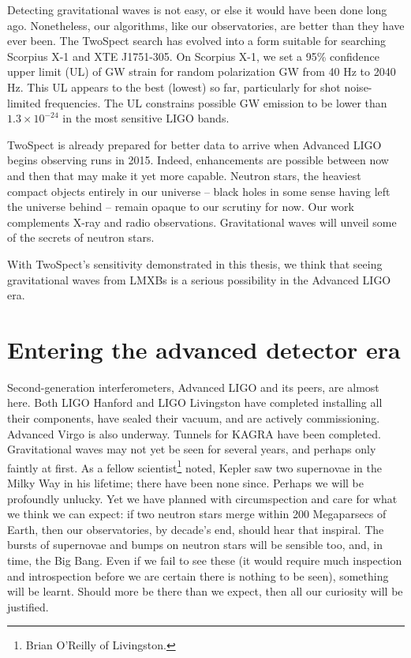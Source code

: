 Detecting gravitational waves is not easy, or else it would have been done long ago.
Nonetheless, our algorithms, like our observatories, are better than they have ever been.
The TwoSpect search has evolved into a form suitable for searching Scorpius X-1 and XTE J1751-305.
On Scorpius X-1, we set a 95\% confidence upper limit (UL) of GW strain for random polarization GW from 40 Hz to 2040 Hz.
This UL appears to the best (lowest) so far, particularly for shot noise-limited frequencies.
The UL constrains possible GW emission to be lower than $1.3\times10^{-24}$ in the most sensitive LIGO bands.

TwoSpect is already prepared for better data to arrive when Advanced LIGO begins observing runs in 2015.
Indeed, enhancements are possible between now and then that may make it yet more capable.
Neutron stars, the heaviest compact objects entirely in our universe -- black holes in some sense having left the universe behind -- remain opaque to our scrutiny for now.
Our work complements X-ray and radio observations.
Gravitational waves will unveil some of the secrets of neutron stars.

With TwoSpect's sensitivity demonstrated in this thesis, we think that seeing gravitational waves from LMXBs is a serious possibility in the Advanced LIGO era.


    \section{Entering the advanced detector era}
    \label{advanced_detector_era}


Second-generation interferometers, Advanced LIGO and its peers, are almost here. 
Both LIGO Hanford and LIGO Livingston have completed installing all their components, have sealed their vacuum, and are actively commissioning.
Advanced Virgo is also underway.
Tunnels for KAGRA have been completed.
Gravitational waves may not yet be seen for several years, and perhaps only faintly at first.
As a fellow scientist\footnote{Brian O'Reilly of Livingston.} noted, Kepler saw two supernovae in the Milky Way in his lifetime; there have been none since.
Perhaps we will be profoundly unlucky.
Yet we have planned with circumspection and care for what we think we can expect: if two neutron stars merge within 200 Megaparsecs of Earth, then our observatories, by decade's end, should hear that inspiral.
The bursts of supernovae and bumps on neutron stars will be sensible too, and, in time, the Big Bang.
Even if we fail to see these (it would require much inspection and introspection before we are certain there is nothing to be seen), something will be learnt.
Should more be there than we expect, then all our curiosity will be justified.

